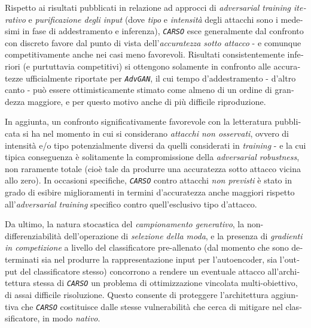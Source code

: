 \begin{otherlanguage}{italian}
Rispetto ai risultati pubblicati in relazione ad approcci di \textit{adversarial training iterativo} e \textit{purificazione degli input} (dove \textit{tipo} e \textit{intensità} degli attacchi sono i medesimi in fase di addestramento e inferenza), \textit{\texttt{CARSO}} esce generalmente dal confronto con discreto favore dal punto di vista dell'\textit{accuratezza sotto attacco} - e comunque competitivamente anche nei casi meno favorevoli. Risultati consistentemente inferiori (e purtuttavia competitivi) si ottengono solamente in confronto alle accuratezze ufficialmente riportate per \textit{\texttt{AdvGAN}}, il cui tempo d'addestramento - d'altro canto - può essere ottimisticamente stimato come almeno di un ordine di grandezza maggiore, e per questo motivo anche di più difficile riproduzione.

In aggiunta, un confronto significativamente favorevole con la letteratura pubblicata si ha nel momento in cui si considerano \textit{attacchi non osservati}, ovvero di intensità e/o tipo potenzialmente diversi da quelli considerati in \textit{training} - e la cui tipica conseguenza è solitamente la compromissione della \textit{adversarial robustness}, non raramente totale (cioè tale da produrre una accuratezza sotto attacco vicina allo zero). In occasioni specifiche, \textit{\texttt{CARSO}} contro attacchi \textit{non previsti} è stato in grado di esibire miglioramenti in termini d'accuratezza anche maggiori rispetto all'\textit{adversarial training} specifico contro quell'esclusivo tipo d'attacco.

Da ultimo, la natura stocastica del \textit{campionamento generativo}, la non-differenziabilità dell'operazione di \textit{selezione della moda}, e la presenza di \textit{gradienti in competizione} a livello del classificatore pre-allenato (dal momento che sono determinati sia nel produrre la rappresentazione input per l'autoencoder, sia l'output del classificatore stesso) concorrono a rendere un eventuale attacco all'architettura stessa di \textit{\texttt{CARSO}} un problema di ottimizzazione vincolata multi-obiettivo, di assai difficile risoluzione. Questo consente di proteggere l'architettura aggiuntiva che \textit{\texttt{CARSO}} costituisce dalle stesse vulnerabilità che cerca di mitigare nel classificatore, in modo \textit{nativo}.

\end{otherlanguage}